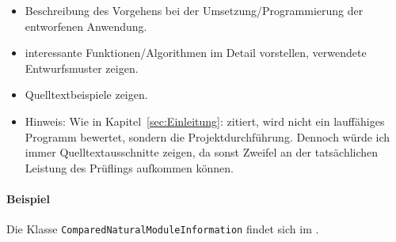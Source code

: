 \begin{itemize}
	\item Beschreibung des Vorgehens bei der Umsetzung/Programmierung der entworfenen Anwendung.
	\item \Ggfs interessante Funktionen/Algorithmen im Detail vorstellen, verwendete Entwurfsmuster zeigen.
	\item Quelltextbeispiele zeigen.
	\item Hinweis: Wie in Kapitel~\ref{sec:Einleitung}:  zitiert, wird nicht ein lauffähiges Programm bewertet, sondern die Projektdurchführung. Dennoch würde ich immer Quelltextausschnitte zeigen, da sonst Zweifel an der tatsächlichen Leistung des Prüflings aufkommen können.
\end{itemize}

\paragraph{Beispiel}
Die Klasse \texttt{Com\-par\-ed\-Na\-tu\-ral\-Mo\-dule\-In\-for\-ma\-tion} findet sich im .  


